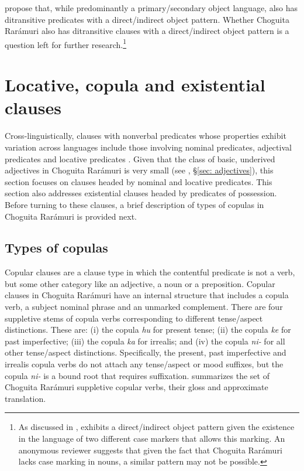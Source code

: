 \citet{guerrero2004yaqui} propose that, while predominantly a primary{\slash}secondary object language,  also has ditransitive predicates with a direct{\slash}indirect object pattern. Whether Choguita Rarámuri also has ditransitive clauses with a direct/indirect object pattern is a question left for further research.\footnote{As discussed in \citet{guerrero2004yaqui},  exhibits a direct\slash indirect object pattern given the existence in the language of two different case markers that allows this marking. An anonymous reviewer suggests that given the fact that Choguita Rarámuri lacks case marking in nouns, a similar pattern may not be possible.}


\section{Locative, copula and existential clauses}
\label{sec: nonverbal predicates}
\largerpage

Cross-linguistically, clauses with nonverbal predicates whose properties exhibit variation across languages include those involving nominal predicates, adjectival predicates and locative predicates \parencite{dryer2007clause}. Given that the class of basic, underived adjectives in Choguita Rarámuri is very small (see , §\ref{sec: adjectives}), this section focuses on clauses headed by nominal and locative predicates. This section also addresses existential clauses headed by predicates of possession. Before turning to these clauses, a brief description of types of copulas in Choguita Rarámuri is provided next.

\subsection{Types of copulas}
\label{subsec: types of copulas}
Copular clauses are a clause type in which the contentful predicate is not a verb, but some other category like an adjective, a noun or a preposition. Copular clauses in Choguita Rarámuri have an internal structure that includes a copula verb, a subject nominal phrase and an unmarked complement. There are four suppletive stems of copula verbs corresponding to different tense/aspect distinctions. These are: (i) the copula \textit{hu} for present tense; (ii) the copula \textit{ke} for past imperfective; (iii) the copula \textit{ka} for irrealis; and (iv) the copula \textit{ni-} for all other tense/aspect distinctions. Specifically, the present, past imperfective and irrealis copula verbs do not attach any tense/aspect or mood suffixes, but the copula \textit{ni-} is a bound root that requires suffixation.  summarizes the set of Choguita Rarámuri suppletive copular verbs, their gloss and approximate translation.



